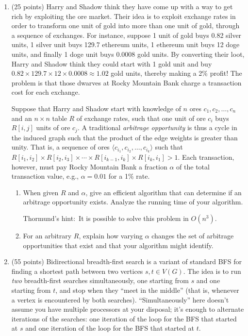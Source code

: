 \documentclass[12pt]{article}
\begin{document}
\begin{enumerate}
	
	\item (25 points) Harry and Shadow think they have come up with a way to get rich by exploiting the ore market. Their idea is to exploit exchange rates in order to transform one unit of gold into more than one unit of gold, through a sequence of exchanges. For instance, suppose 1 unit of gold buys 0.82 silver units, 1 silver unit buys 129.7 ethereum units, 1 ethereum unit buys 12 doge units, and finally 1 doge unit buys 0.0008 gold units. By converting their loot, Harry and Shadow think they could start with 1 gold unit and buy $0.82 \times 129.7 \times 12 \times 0.0008 \approx 1.02$ gold units, thereby making a 2\% profit! The problem is that those dwarves at Rocky  Mountain  Bank  charge a transaction cost for each exchange.
	
	Suppose that Harry and Shadow start with knowledge of $n$ ores $c_{1},c_{2},\dots,c_{n}$ and an $n\times n$ table $R$ of exchange rates, such that one unit of ore $c_{i}$ buys $R[i,j]$ units of ore $c_{j}$. A traditional \textit{arbitrage opportunity} is thus a cycle in the induced graph such that the product of the edge weights is greater than unity. That is, a sequence of ores $\langle c_{i_{1}} , c_{i_{2}}, \dots, c_{i_{k}}\rangle$ such that $R[i_{1}, i_{2}] \times R[i_{2}, i_{3}] \times \cdots \times R[i_{k-1}, i_{k}] \times R[i_{k}, i_{1}] > 1$. Each transaction, however, must pay Rocky  Mountain  Bank a fraction $\alpha$ of the total transaction value, e.g., $\alpha=0.01$ for a 1\% rate.

	\begin{enumerate}
	\item When given $R$ and $\alpha$, give an efficient algorithm that can determine if an arbitrage opportunity exists. Analyze the running time of your algorithm.
	
	Thormund's hint:\ It is possible to solve this problem in $O(n^{3})$. 
	\item For an arbitrary $R$, explain how varying $\alpha$ changes the set of arbitrage opportunities that exist and that your algorithm might identify.
	\end{enumerate}
    
    \pagebreak
	
	\item (55 points) Bidirectional breadth-first search is a variant of standard BFS for finding a shortest path between two vertices $s,t \in V(G)$. The idea is to run \emph{two} breadth-first searches simultaneously, one starting from $s$ and one starting from $t$, and stop when they ``meet in the middle'' (that is, whenever a vertex is encountered by both searches). ``Simultaneously'' here doesn't assume you have multiple processors at your disposal; it's enough to alternate iterations of the searches: one iteration of the loop for the BFS that started at $s$ and one iteration of the loop for the BFS that started at $t$.
	

\end{enumerate}
\end{document}
